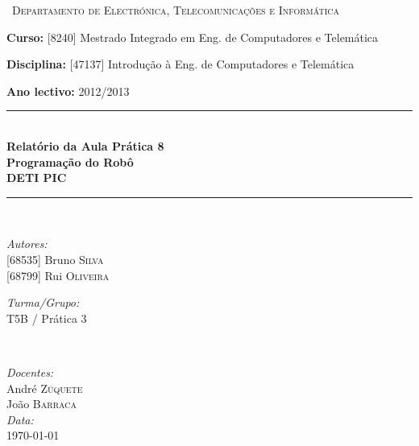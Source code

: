 \documentclass[a4paper, 12pt, onecolumn, oneside]{report}
\begin{document}
\begin{titlepage}

\newcommand{\HRule}{\rule{\linewidth}{0.4mm}} %

\center 


\begin{figure}[H] 
\center{\texttt{[image: UA1]}}
\end{figure}


\textsc{\ Departamento de Electrónica, Telecomunicações e Informática
 }\\[0.9cm] 

{\raggedright \textbf{Curso:} [8240] Mestrado Integrado em Eng. de Computadores e Telemática

\textbf{Disciplina:} [47137] Introdução à Eng. de Computadores e Telemática

\textbf{Ano lectivo:} 2012/2013 \\[1cm] 

}


\HRule \\[0.1cm]
{ \huge \bfseries Relatório da Aula Prática 8 \\
[0.4cm]  
Programação do Robô \\ [0.4cm] DETI PIC }\\[0.4cm] 
\HRule \\[1cm]


\begin{minipage}{0.4\textwidth} 
\begin{flushleft} \large
\emph{Autores:}\\
{[68535] Bruno \textsc{Silva}} \\
{[68799] Rui \textsc{Oliveira} } 


\emph{Turma/Grupo:}\\
T5B / Prática 3\\

\end{flushleft}
\end{minipage}
~
\begin{minipage}{0.4\textwidth}
\begin{flushright} \large
\emph{Docentes:} \\
André \textsc{Zúquete} \\
João \textsc{Barraca} \\
\emph{Data:} \\
\today 
\end{flushright}
\end{minipage}\\[2cm]



\vfill 

\end{titlepage}
\end{document}
